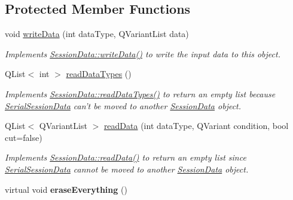 \subsection*{Protected Member Functions}
\begin{DoxyCompactItemize}
\item 
void \hyperlink{class_serial_session_data_ad996f9694ff85fd04024b3ae4230491c}{write\-Data} (int data\-Type, Q\-Variant\-List data)
\begin{DoxyCompactList}\small\item\em Implements \hyperlink{class_session_data_ad05a594d8410d638f1a066bfa5a10ba3}{Session\-Data\-::write\-Data()} to write the input data to this object. \end{DoxyCompactList}\item 
\hypertarget{class_serial_session_data_a7d47ce8b0be3b922f74c703d0d010bd0}{Q\-List$<$ int $>$ \hyperlink{class_serial_session_data_a7d47ce8b0be3b922f74c703d0d010bd0}{read\-Data\-Types} ()}\label{class_serial_session_data_a7d47ce8b0be3b922f74c703d0d010bd0}

\begin{DoxyCompactList}\small\item\em Implements \hyperlink{class_session_data_a4b879f10ecfbfcaa12c2dbbc1b15bdff}{Session\-Data\-::read\-Data\-Types()} to return an empty list because \hyperlink{class_serial_session_data}{Serial\-Session\-Data} can't be moved to another \hyperlink{class_session_data}{Session\-Data} object. \end{DoxyCompactList}\item 
\hypertarget{class_serial_session_data_ae16eba34feb9bfd97dcdfa22c750dedb}{Q\-List$<$ Q\-Variant\-List $>$ \hyperlink{class_serial_session_data_ae16eba34feb9bfd97dcdfa22c750dedb}{read\-Data} (int data\-Type, Q\-Variant condition, bool cut=false)}\label{class_serial_session_data_ae16eba34feb9bfd97dcdfa22c750dedb}

\begin{DoxyCompactList}\small\item\em Implements \hyperlink{class_session_data_a81f4eb49b8a23eb9c1a1575abc2fad4c}{Session\-Data\-::read\-Data()} to return an empty list since \hyperlink{class_serial_session_data}{Serial\-Session\-Data} cannot be moved to another \hyperlink{class_session_data}{Session\-Data} object. \end{DoxyCompactList}\item 
\hypertarget{class_serial_session_data_a5d4c16a0647b956bd11a7d3b2ae41f3f}{virtual void {\bfseries erase\-Everything} ()}\label{class_serial_session_data_a5d4c16a0647b956bd11a7d3b2ae41f3f}

\end{DoxyCompactItemize}
